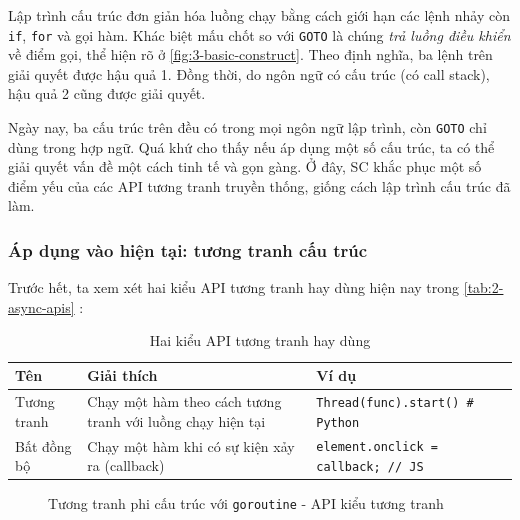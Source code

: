 \documentclass[../../thesis]{subfiles}
\begin{document}
Lập trình cấu trúc đơn giản hóa luồng chạy bằng cách giới hạn các lệnh nhảy còn
\texttt{if}, \texttt{for} và gọi hàm. Khác biệt mấu chốt so với \texttt{GOTO} là
chúng \emph{trả luồng điều khiển} về điểm gọi, thể hiện rõ ở
\autoref{fig:3-basic-construct}. Theo định nghĩa, ba lệnh trên giải quyết được
hậu quả 1. Đồng thời, do ngôn ngữ có cấu trúc (có call stack), hậu quả 2 cũng
được giải quyết.

Ngày nay, ba cấu trúc trên đều có trong mọi ngôn ngữ lập trình, còn
\texttt{GOTO} chỉ dùng trong hợp ngữ. Quá khứ cho thấy nếu áp dụng một số cấu
trúc, ta có thể giải quyết vấn đề một cách tinh tế và gọn gàng. Ở đây, SC khắc
phục một số điểm yếu của các API tương tranh truyền thống, giống cách lập trình
cấu trúc đã làm.

\subsubsection{Áp dụng vào hiện tại: tương tranh cấu trúc}

Trước hết, ta xem xét hai kiểu API tương tranh hay dùng hiện nay trong
\autoref{tab:2-async-apis} \cite{NJS_SC}:


\begin{table}[H]
    \centering
    \caption{Hai kiểu API tương tranh hay dùng \cite{NJS_SC}}
    \label{tab:2-async-apis}
    \begin{tabular}{l p{5.5cm} l}
        \toprule
        Tên         & Giải thích                                                 & Ví dụ \\
        \midrule
        Tương tranh & Chạy một hàm theo cách tương tranh với luồng chạy hiện tại & \texttt{Thread(func).start() # Python} \\
        Bất đồng bộ & Chạy một hàm khi có sự kiện xảy ra (callback)              & \texttt{element.onclick = callback; // JS} \\
        \bottomrule
    \end{tabular}
\end{table}

\begin{figure}
    \centering
    \vspace*{-7mm}
    
    \vspace*{-10mm}
    \caption{Tương tranh phi cấu trúc với \texttt{goroutine} - API kiểu tương
        tranh \cite{NJS_SC}}
    \label{fig:goroutine}
\end{figure}
\end{document}

